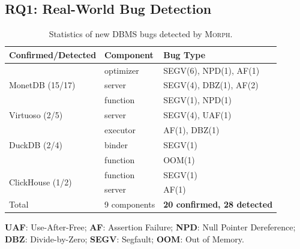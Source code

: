 \documentclass[conference]{IEEEtran}
\newcommand{\tool}{\textsc{Morph}\xspace}
\begin{document}
\subsection{RQ1: Real-World Bug Detection}
\begin{table}[b]
\centering
\small
\caption{Statistics of new DBMS bugs detected by \tool{}.}
\label{tab:real-world-bugs}
\setlength{\tabcolsep}{4pt}

\begin{tabularx}{\columnwidth}{l|l|X}
\toprule
\textbf{Confirmed/Detected} & \textbf{Component} & \textbf{Bug Type} \\
\midrule
\multirow{3}{*}{MonetDB (15/17)}
  & optimizer & SEGV(6), NPD(1), AF(1) \\
  & server    & SEGV(4), DBZ(1), AF(2) \\
  & function  & SEGV(1), NPD(1)        \\
\midrule
\multirow{1}{*}{Virtuoso (2/5)}
  & server    & SEGV(4), UAF(1)        \\
\midrule
\multirow{3}{*}{DuckDB (2/4)}
  & executor  & AF(1), DBZ(1)          \\
  & binder    & SEGV(1)                \\
  & function  & OOM(1)                 \\
\midrule
\multirow{2}{*}{ClickHouse (1/2)}
  & function  & SEGV(1)                \\
  & server    & AF(1)                  \\
\midrule
Total & 9 components & \textbf{20 confirmed, 28 detected} \\
\bottomrule
\end{tabularx}
\par\vspace{0.2em}
{\footnotesize \textbf{UAF}: Use-After-Free; \textbf{AF}: Assertion Failure; \textbf{NPD}: Null Pointer Dereference; \textbf{DBZ}: Divide-by-Zero; \textbf{SEGV}: Segfault; \textbf{OOM}: Out of Memory.}
\end{table}
\end{document}
